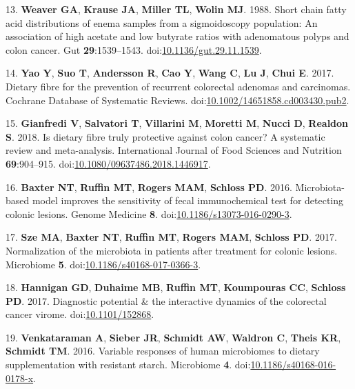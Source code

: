 \documentclass[11pt,]{article}
\begin{document}
\leavevmode\hypertarget{ref-Weaver1988}{}%
13. \textbf{Weaver GA}, \textbf{Krause JA}, \textbf{Miller TL},
\textbf{Wolin MJ}. 1988. Short chain fatty acid distributions of enema
samples from a sigmoidoscopy population: An association of high acetate
and low butyrate ratios with adenomatous polyps and colon cancer. Gut
\textbf{29}:1539--1543.
doi:\href{https://doi.org/10.1136/gut.29.11.1539}{10.1136/gut.29.11.1539}.

\leavevmode\hypertarget{ref-Yao2017}{}%
14. \textbf{Yao Y}, \textbf{Suo T}, \textbf{Andersson R}, \textbf{Cao
Y}, \textbf{Wang C}, \textbf{Lu J}, \textbf{Chui E}. 2017. Dietary fibre
for the prevention of recurrent colorectal adenomas and carcinomas.
Cochrane Database of Systematic Reviews.
doi:\href{https://doi.org/10.1002/14651858.cd003430.pub2}{10.1002/14651858.cd003430.pub2}.

\leavevmode\hypertarget{ref-Gianfredi2018}{}%
15. \textbf{Gianfredi V}, \textbf{Salvatori T}, \textbf{Villarini M},
\textbf{Moretti M}, \textbf{Nucci D}, \textbf{Realdon S}. 2018. Is
dietary fibre truly protective against colon cancer? A systematic review
and meta-analysis. International Journal of Food Sciences and Nutrition
\textbf{69}:904--915.
doi:\href{https://doi.org/10.1080/09637486.2018.1446917}{10.1080/09637486.2018.1446917}.

\leavevmode\hypertarget{ref-Baxter2016}{}%
16. \textbf{Baxter NT}, \textbf{Ruffin MT}, \textbf{Rogers MAM},
\textbf{Schloss PD}. 2016. Microbiota-based model improves the
sensitivity of fecal immunochemical test for detecting colonic lesions.
Genome Medicine \textbf{8}.
doi:\href{https://doi.org/10.1186/s13073-016-0290-3}{10.1186/s13073-016-0290-3}.

\leavevmode\hypertarget{ref-Sze2017}{}%
17. \textbf{Sze MA}, \textbf{Baxter NT}, \textbf{Ruffin MT},
\textbf{Rogers MAM}, \textbf{Schloss PD}. 2017. Normalization of the
microbiota in patients after treatment for colonic lesions. Microbiome
\textbf{5}.
doi:\href{https://doi.org/10.1186/s40168-017-0366-3}{10.1186/s40168-017-0366-3}.

\leavevmode\hypertarget{ref-Hannigan2017}{}%
18. \textbf{Hannigan GD}, \textbf{Duhaime MB}, \textbf{Ruffin MT},
\textbf{Koumpouras CC}, \textbf{Schloss PD}. 2017. Diagnostic potential
\& the interactive dynamics of the colorectal cancer virome.
doi:\href{https://doi.org/10.1101/152868}{10.1101/152868}.

\leavevmode\hypertarget{ref-Venkataraman2016}{}%
19. \textbf{Venkataraman A}, \textbf{Sieber JR}, \textbf{Schmidt AW},
\textbf{Waldron C}, \textbf{Theis KR}, \textbf{Schmidt TM}. 2016.
Variable responses of human microbiomes to dietary supplementation with
resistant starch. Microbiome \textbf{4}.
doi:\href{https://doi.org/10.1186/s40168-016-0178-x}{10.1186/s40168-016-0178-x}.
\end{document}
